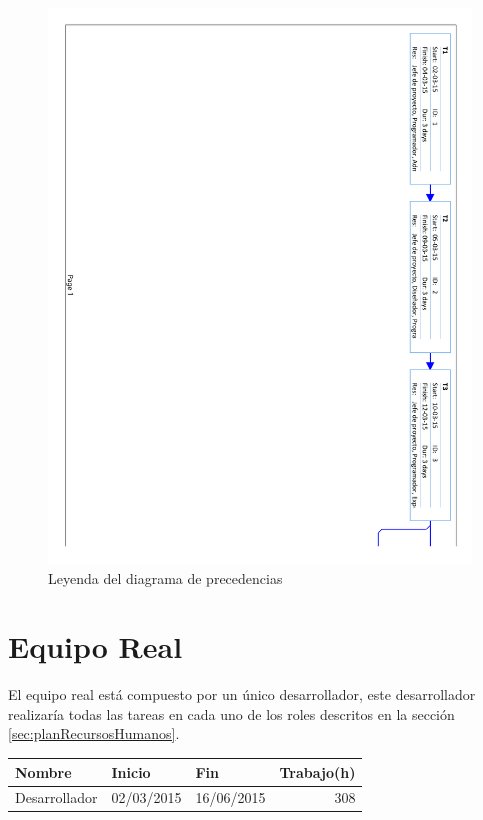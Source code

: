 \begin{figure}[!htbp]
	\centering
	\includegraphics[page=4, scale=.65]{fig/real_network_diagram}
	\caption{Leyenda del diagrama de precedencias}
\end{figure}

\FloatBarrier

\section{Equipo Real}

El equipo real está compuesto por un único desarrollador, este desarrollador realizaría todas las tareas en cada uno de los roles descritos en la sección \ref{sec:planRecursosHumanos}.

\begin{center}
	\begin{tabular}{|l|l|l|r|}
		\hline
		Nombre & Inicio & Fin & Trabajo(h) \\ \hline
		Desarrollador & 02/03/2015 & 16/06/2015 & 308 \\
		\hline
	\end{tabular}
\end{center}

